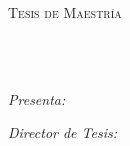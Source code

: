 \documentclass[
10pt, %
spanish, %
onehalfspacing,%
headsepline, %
]{MastersDoctoralThesis} %
\author{Joel \textsc{Chacón Castillo}} %
\begin{document}
\frontmatter %

\pagestyle{plain} %


\begin{titlepage}
\begin{center}
{\scshape\LARGE \univname\par}\vspace{1.5cm} %
\textsc{\Large Tesis de Maestr\'ia}\\[0.5cm] %
\HRule \\[0.4cm] %
{\huge \bfseries \ttitle\par}\vspace{0.4cm} %
\HRule \\[1.5cm] %
 
\begin{minipage}[t]{0.4\textwidth}
\begin{flushleft} \large
\emph{Presenta:}\\
\authorname
\end{flushleft}
\end{minipage}
\begin{minipage}[t]{0.4\textwidth}
\begin{flushright} \large
\emph{Director de Tesis:} \\
\supname

\end{flushright}
\end{minipage}\\[3cm]



\end{center}
\end{titlepage}
\end{document}
